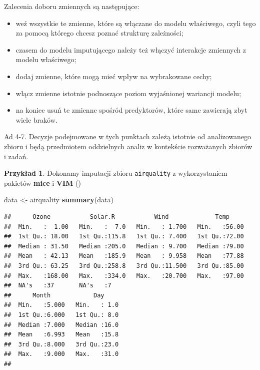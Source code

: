 \documentclass[
]{book}
\newenvironment{Shaded}{\begin{snugshade}}{\end{snugshade}}
\newcommand{\FunctionTok}[1]{\textcolor[rgb]{0.13,0.29,0.53}{\textbf{#1}}}
\newcommand{\NormalTok}[1]{#1}
\newcommand{\OtherTok}[1]{\textcolor[rgb]{0.56,0.35,0.01}{#1}}
\providecommand{\tightlist}{%
  \setlength{\itemsep}{0pt}\setlength{\parskip}{0pt}}
\theoremstyle{plain}
\theoremstyle{definition}
\theoremstyle{definition}
\theoremstyle{definition}
\newtheorem{example}{Przykład}[chapter]
\theoremstyle{definition}
\theoremstyle{definition}
\theoremstyle{remark}
\begin{document}
Zalecenia doboru zmiennych są następujące:

\begin{itemize}
\tightlist
\item
  weź wszystkie te zmienne, które są włączane do modelu właściwego, czyli tego za pomocą którego chcesz poznać strukturę zależności;
\item
  czasem do modelu imputującego należy też włączyć interakcje zmiennych z modelu właściwego;
\item
  dodaj zmienne, które mogą mieć wpływ na wybrakowane cechy;
\item
  włącz zmienne istotnie podnoszące poziom wyjaśnionej wariancji modelu;
\item
  na koniec usuń te zmienne spośród predyktorów, które same zawierają zbyt wiele braków.
\end{itemize}

Ad 4-7. Decyzje podejmowane w tych punktach zależą istotnie od analizowanego zbioru i będą przedmiotem oddzielnych analiz w kontekście rozważanych zbiorów i zadań.

\begin{example}
\protect\hypertarget{exm:przyk21}{}\label{exm:przyk21}Dokonamy imputacji zbioru \texttt{airquality} z wykorzystaniem pakietów \textbf{mice} i \textbf{VIM} ()
\end{example}

\begin{Shaded}
\begin{Highlighting}[]
\NormalTok{data }\OtherTok{\textless{}{-}}\NormalTok{ airquality}
\FunctionTok{summary}\NormalTok{(data)}
\end{Highlighting}
\end{Shaded}

\begin{verbatim}
##      Ozone           Solar.R           Wind             Temp      
##  Min.   :  1.00   Min.   :  7.0   Min.   : 1.700   Min.   :56.00  
##  1st Qu.: 18.00   1st Qu.:115.8   1st Qu.: 7.400   1st Qu.:72.00  
##  Median : 31.50   Median :205.0   Median : 9.700   Median :79.00  
##  Mean   : 42.13   Mean   :185.9   Mean   : 9.958   Mean   :77.88  
##  3rd Qu.: 63.25   3rd Qu.:258.8   3rd Qu.:11.500   3rd Qu.:85.00  
##  Max.   :168.00   Max.   :334.0   Max.   :20.700   Max.   :97.00  
##  NA's   :37       NA's   :7                                       
##      Month            Day      
##  Min.   :5.000   Min.   : 1.0  
##  1st Qu.:6.000   1st Qu.: 8.0  
##  Median :7.000   Median :16.0  
##  Mean   :6.993   Mean   :15.8  
##  3rd Qu.:8.000   3rd Qu.:23.0  
##  Max.   :9.000   Max.   :31.0  
## 
\end{verbatim}
\end{document}
